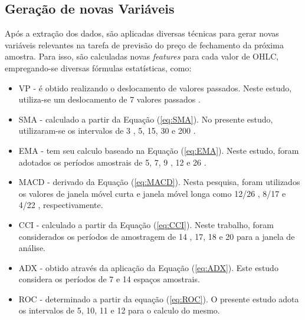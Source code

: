 \subsection{Geração de novas Variáveis}
\label{subsec:feature_generate}
Após a extração dos dados, são aplicadas diversas técnicas para gerar novas variáveis relevantes na tarefa de previsão do preço de fechamento da próxima amostra. Para isso, são calculadas novas \textit{features} para cada valor de \ac{OHLC}, empregando-se diversas fórmulas estatísticas, como:
\begin{itemize}
    \item \ac{VP} - é obtido realizando o deslocamento de valores passados. Neste estudo, utiliza-se um deslocamento de 7 valores passados \cite{Vinicius_Sistemas}.

    \item \ac{SMA} - calculado a partir da Equação (\ref{eq:SMA}). No presente estudo, utilizaram-se os intervalos de 3 \cite{chantarakasemchit2020forex}, 5, 15, 30 \cite{handayani2019longer} e 200 \cite{ELLIS2005399}.
    
    \item \ac{EMA} - tem seu calculo baseado na Equação (\ref{eq:EMA}). Neste estudo, foram adotados os períodos amostrais de 5, 7, 9 \cite{ANBALAGAN2015214}, 12 \cite{Charlene} e 26 \cite{ananthi2021retracted}.
    
    \item \ac{MACD} - derivado da Equação (\ref{eq:MACD}). Nesta pesquisa, foram utilizados os valores de janela móvel curta e janela móvel longa como 12/26 \cite{ANBALAGAN2015214, handayani2019longer}, 8/17 e 4/22 \cite{kang2021improving}, respectivamente.
    
    \item \ac{CCI} - calculado a partir da Equação (\ref{eq:CCI}). Neste trabalho, foram considerados os períodos de amostragem de 14 \cite{halil2019predicting}, 17, 18 \cite{karasu2022crude} e 20 \cite{kelotra2020stock} para a janela de análise.
    
    \item \ac{ADX} - obtido através da aplicação da Equação (\ref{eq:ADX}). Este estudo considera os períodos de 7 \cite{kelotra2020stock} e 14 \cite{shamseddin2022mapping} espaços amostrais.
    
    \item \ac{ROC} - determinado a partir da equação (\ref{eq:ROC}). O presente estudo adota os intervalos de 5, 10, 11 e 12 \cite{karasu2022crude} para o calculo do mesmo.
    

\end{itemize}
